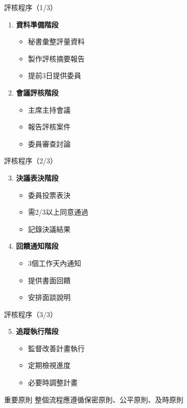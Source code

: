 \documentclass[aspectratio=169,12pt]{beamer}
\begin{document}
\begin{frame}{評核程序（1/3）}
\begin{enumerate}
    \item \textbf{資料準備階段}
    \begin{itemize}
        \item 秘書彙整評量資料
        \item 製作評核摘要報告
        \item 提前3日提供委員
    \end{itemize}
    
    \item \textbf{會議評核階段}
    \begin{itemize}
        \item 主席主持會議
        \item 報告評核案件
        \item 委員審查討論
    \end{itemize}
\end{enumerate}
\end{frame}

\begin{frame}{評核程序（2/3）}
\begin{enumerate}
\setcounter{enumi}{2}
    \item \textbf{決議表決階段}
    \begin{itemize}
        \item 委員投票表決
        \item 需2/3以上同意通過
        \item 記錄決議結果
    \end{itemize}
    
    \item \textbf{回饋通知階段}
    \begin{itemize}
        \item 3個工作天內通知
        \item 提供書面回饋
        \item 安排面談說明
    \end{itemize}
\end{enumerate}
\end{frame}

\begin{frame}{評核程序（3/3）}
\begin{enumerate}
\setcounter{enumi}{4}
    \item \textbf{追蹤執行階段}
    \begin{itemize}
        \item 監督改善計畫執行
        \item 定期檢視進度
        \item 必要時調整計畫
    \end{itemize}
\end{enumerate}

\begin{alertblock}{重要原則}
整個流程應遵循保密原則、公平原則、及時原則
\end{alertblock}
\end{frame}
\end{document}
